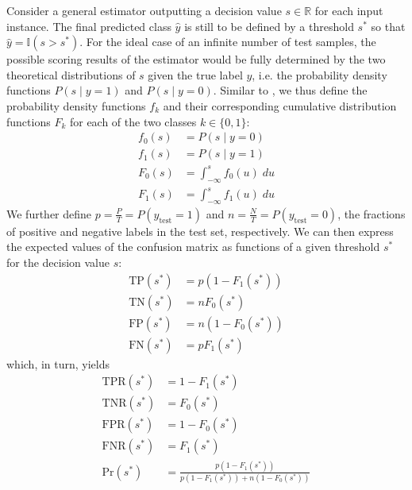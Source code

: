 Consider a general estimator outputting a decision value $s \in \mathbb{R}$ for each input instance. The final predicted class $\hat y$ is still to be defined by a threshold $s^*$ so that $\hat y = \mathbb{I}(s > s^*)$. For the ideal case of an infinite number of test samples, the possible scoring results of the estimator would be fully determined by the two theoretical distributions of $s$ given the true label $y$, i.e. the probability density functions $P(s \mid y = 1)$ and $P(s \mid y = 0)$. Similar to , we thus define the probability density functions $f_k$ and their corresponding cumulative distribution functions $F_k$ for each of the two classes $k \in \{0, 1\}$:
%
\begin{align}
    f_0(s) &= P(s \mid y = 0) \\
    f_1(s) &= P(s \mid y = 1) \\
    F_0(s) &= \int_{-\infty}^s f_0(u)\;du \\
    F_1(s) &= \int_{-\infty}^s f_1(u)\;du
    \label{eq:ideal_confusion_matrix}
\end{align}
%
We further define $p=\frac{P}{T}=P(y_\text{test}=1)$ and $n=\frac{N}{T}=P(y_\text{test}=0)$, the fractions of positive and negative labels in the test set, respectively. We can then express the expected values of the confusion matrix as functions of a given threshold $s^*$ for the decision value $s$:
%
\begin{align}
    \text{TP}(s^*) &= p (1 - F_1(s^*)) \\
    \text{TN}(s^*) &= n F_0(s^*) \\
    \text{FP}(s^*) &= n (1 - F_0(s^*)) \\
    \text{FN}(s^*) &= p F_1(s^*)
\end{align}
%
which, in turn, yields
%
\begin{align}
    \text{TPR}(s^*) &= 1 - F_1(s^*) \\
    \text{TNR}(s^*) &= F_0(s^*) \\
    \text{FPR}(s^*) &= 1 - F_0(s^*) \\
    \text{FNR}(s^*) &= F_1(s^*) \\
    \text{Pr}(s^*) &= \frac{p (1 - F_1(s^*))}{p (1 - F_1(s^*)) + n (1 - F_0(s^*))}
\end{align}

